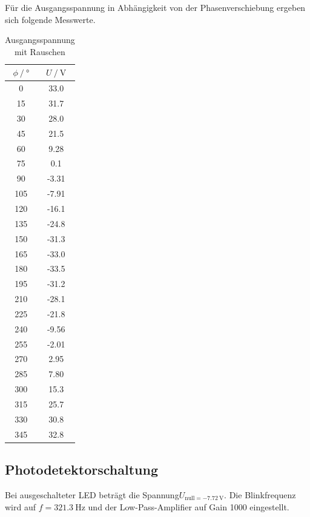 Für die Ausgangsspannung in Abhängigkeit von der Phasenverschiebung ergeben sich folgende Messwerte.
\begin{table}
  \centering
  \caption{Ausgangsspannung mit Rauschen}
  \label{tab:ohne_Rauschen}
  \begin{tabular}{cc}
    \toprule {$\phi \:/\: °$} & {$U \:/\: \si{\volt}$} \\
    \midrule
    0	& 33.0 \\
    15 & 31.7 \\
    30 & 28.0 \\
    45	& 21.5 \\
    60 & 9.28 \\
    75 & 0.1 \\
    90	& -3.31 \\
    105 & -7.91 \\
    120	& -16.1 \\
    135	& -24.8 \\
    150	& -31.3 \\
    165 & -33.0 \\
    180	& -33.5 \\
    195	& -31.2 \\
    210	& -28.1 \\
    225	& -21.8 \\
    240 & -9.56 \\
    255	& -2.01 \\
    270	& 2.95 \\
    285	& 7.80 \\
    300	& 15.3 \\
    315	& 25.7 \\
    330	& 30.8 \\
    345	& 32.8 \\
    \bottomrule
    \end{tabular}
\end{table}

\subsection{Photodetektorschaltung}
Bei ausgeschalteter LED beträgt die Spannung$U_{\mathrm{null} = \SI {-7,72}{\volt}}$.
Die Blinkfrequenz wird auf $f = \SI {321,3}{\Hz}$ und der Low-Pass-Amplifier auf Gain 1000 eingestellt.

